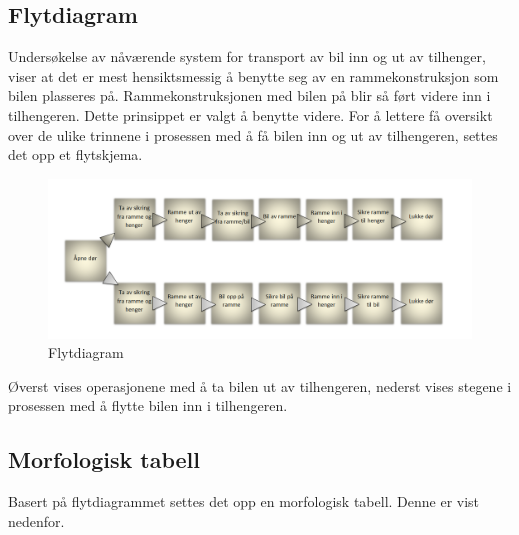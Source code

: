 \subsection{Flytdiagram}
\begin{flushleft}
Undersøkelse av nåværende system for transport av bil inn og ut av tilhenger, viser at det er mest hensiktsmessig å benytte seg av en rammekonstruksjon som bilen plasseres på. Rammekonstruksjonen med bilen på blir så ført videre inn i tilhengeren. Dette prinsippet er valgt å benytte videre. For å lettere få oversikt over de ulike trinnene i prosessen med å få bilen inn og ut av tilhengeren, settes det opp et flytskjema.
\end{flushleft}

\begin{figure}[H]
\begin{center}
\leavevmode
\includegraphics[width=\textwidth]{images/Bildet_3}
\end{center}
\caption{Flytdiagram}
\label{fig:flowchart}
\end{figure}

\begin{flushleft}
Øverst vises operasjonene med å ta bilen ut av tilhengeren, nederst vises stegene i prosessen med å flytte bilen inn i tilhengeren.\newpage

\subsection{Morfologisk tabell}
Basert på flytdiagrammet settes det opp en morfologisk tabell. Denne er vist nedenfor.
\end{flushleft}

